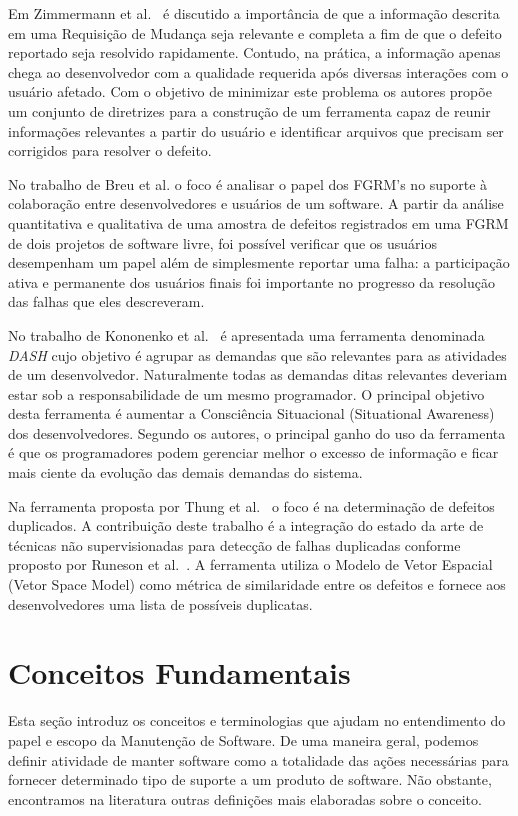 Em Zimmermann et al.~\cite{5070993} é discutido a importância de que a
informação descrita em uma Requisição de Mudança seja relevante e completa a
fim de que o defeito reportado seja resolvido rapidamente. Contudo, na prática,
a informação apenas chega ao desenvolvedor com a qualidade requerida após
diversas interações com o usuário afetado. Com o objetivo de minimizar este
problema os autores propõe um conjunto de diretrizes para a construção de um
ferramenta capaz de reunir informações relevantes a partir do usuário e
identificar arquivos que precisam ser corrigidos para resolver o defeito.

No trabalho de Breu et al.\cite{Breu:2010:INB:1718918.1718973} o foco é
analisar o papel dos FGRM's no suporte à colaboração entre desenvolvedores e
usuários de um software. A partir da análise quantitativa e qualitativa de uma
amostra de defeitos registrados em uma FGRM de dois projetos de software livre,
foi possível verificar que os usuários desempenham um papel além de
simplesmente reportar uma falha: a participação ativa e permanente dos usuários
finais foi importante no progresso da resolução das falhas que eles
descreveram.

No trabalho de Kononenko et al.~\cite{Kononenko:2014:DED:2591062.2591075} é
apresentada uma ferramenta denominada \textit{DASH} cujo objetivo é agrupar as
demandas que são relevantes para as atividades de um desenvolvedor.
Naturalmente todas as demandas ditas relevantes deveriam estar sob a
responsabilidade de um mesmo programador. O principal objetivo desta ferramenta
é aumentar a Consciência Situacional (Situational Awareness) dos
desenvolvedores. Segundo os autores, o principal ganho do uso da ferramenta é
que os programadores podem gerenciar melhor o excesso de informação e ficar
mais ciente da evolução das demais demandas do sistema.

Na ferramenta proposta por Thung et al.~\cite{Thung:2014:DIT:2642937.2648627} o
foco é na determinação de defeitos duplicados. A contribuição deste trabalho é
a integração do estado da arte de técnicas não supervisionadas para detecção de
falhas duplicadas conforme proposto por Runeson et
al.~\cite{Runeson:2007:DDD:1248820.1248882}. A ferramenta utiliza o Modelo de
Vetor Espacial (Vetor Space Model) como métrica de similaridade entre os
defeitos e fornece aos desenvolvedores uma lista de possíveis duplicatas.

\section{Conceitos Fundamentais}
\label{sec:conceitos_basicos}
Esta seção introduz os conceitos e terminologias que ajudam no entendimento do papel e
escopo da Manutenção de Software. De uma maneira geral, podemos definir atividade de manter software
como a totalidade das ações necessárias para fornecer determinado tipo de suporte a um produto de software. 
Não obstante, encontramos na literatura outras definições mais elaboradas sobre o
conceito.


